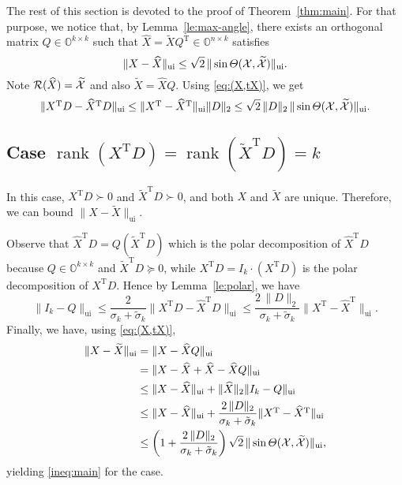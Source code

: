 \documentclass[11pt]{article}
\def\bbO{\mathbb{O}}
\def\cR{{\cal R}}
\def\cX{{\cal X}}
\DeclareMathOperator{\diag}{diag}
\DeclareMathOperator{\rank}{rank}
\DeclareMathOperator{\T}{T}
\DeclareMathOperator{\UI}{ui}
\def\wtd{\widetilde}
\def\what{\widehat}
\theoremstyle{definition}
\numberwithin{equation}{section}
\numberwithin{figure}{section}
\numberwithin{table}{section}
\begin{document}
The rest of this section is devoted to the proof of Theorem~\ref{thm:main}. For that purpose, we notice that,
by Lemma~\ref{le:max-angle}, there exists an orthogonal matrix $Q\in\bbO^{k\times k}$
such that $\what X=\wtd X Q^{\T}\in\bbO^{n\times k}$ satisfies
\begin{equation}\label{eq:(X,tX)}
    \|X-\what X\|_{\UI}\le\sqrt 2\,\|\sin\Theta(\cX,\wtd\cX)\|_{\UI}.
\end{equation}
Note $\cR(\what X)=\wtd\cX$ and also $\wtd X=\what XQ$. Using \eqref{eq:(X,tX)}, we get
\begin{equation}\label{eq:xd-x0td}
\|X^{\T}D-\what X^{\T}D\|_{\UI}\le\|X^{\T}-\what X^{\T}\|_{\UI}\|D\|_2
\le\sqrt 2\,\|D\|_2\,\|\sin\Theta(\cX,\wtd\cX)\|_{\UI}.
\end{equation}



\subsection{Case $\rank(X^{\T}D)=\rank(\wtd X^{\T}D)=k$}
In this case, $X^{\T}D\succ 0$ and $\wtd X^{\T}D\succ 0$, and both $X$ and $\wtd X$ are unique.
Therefore, we can bound $\|X-\wtd X\|_{\UI}$.


Observe that $\what X^{\T}D=Q(\wtd X^{\T}D)$ which is the polar decomposition of $\what X^{\T}D$ because $Q\in\bbO^{k\times k}$ and
$\wtd X^{\T}D\succeq 0$, while
$X^{\T}D=I_k\cdot(X^{\T}D)$ is the polar decomposition of $X^{\T}D$. Hence by Lemma~\ref{le:polar}, we have
$$
\|I_k-Q\|_{\UI}\le\frac{2}{\sigma_k+\tilde\sigma_k}\|X^{\T}D-\what X^{\T}D\|_{\UI}
     \le\frac{2\,\|D\|_2}{\sigma_k+\tilde\sigma_k}\|X^{\T}-\what X^{\T}\|_{\UI}.
$$
Finally, we have, using \eqref{eq:(X,tX)},
\begin{align}
\|X-\wtd X\|_{\UI}&=\|X-\what XQ\|_{\UI} \nonumber\\
 &=\|X-\what X+\what X-\what XQ\|_{\UI} \nonumber\\
 &\le\|X-\what X\|_{\UI}+\|\what X\|_2\|I_k-Q\|_{\UI} \nonumber\\
 &\le\|X-\what X\|_{\UI}
       +\frac{2\,\|D\|_2}{\sigma_k+\tilde\sigma_k}\|X^{\T}-\what X^{\T}\|_{\UI} \nonumber\\
&\le\left(1+\frac{2\,\|D\|_2}{\sigma_k+\tilde\sigma_k}\right)\sqrt 2\,\|\sin\Theta(\cX,\wtd\cX)\|_{\UI},
  \label{eq:upb1}
\end{align}
yielding \eqref{ineq:main} for the case.
\end{document}
